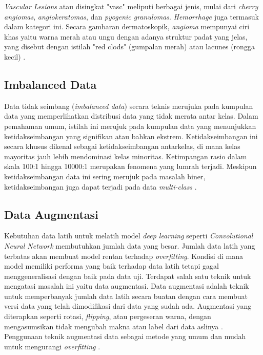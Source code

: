 \textit{Vascular Lesions} atau disingkat "vasc" meliputi berbagai jenis, 
mulai dari \textit{cherry angiomas}, \textit{angiokeratomas}, dan \textit{
pyogenic granulomas}. \textit{Hemorrhage} juga termasuk dalam kategori ini.
Secara gambaran dermatoskopik, \textit{angioma} mempunyai ciri khas yaitu 
warna merah atau ungu dengan adanya struktur padat yang jelas, yang disebut
dengan istilah "red clods" (gumpalan merah) atau lacunes (rongga kecil) \cite{tschandl2018ham10000}. \par


\subsection{Imbalanced Data} \label{II.Teori2}
Data tidak seimbang (\textit{imbalanced data}) secara teknis merujuka pada 
kumpulan data yang memperlihatkan distribusi data yang tidak merata antar 
kelas. Dalam pemahaman umum, istilah ini merujuk pada kumpulan data yang 
menunjukkan ketidakseimbangan yang signifikan atau bahkan ekstrem. 
Ketidakseimbangan ini secara khusus dikenal sebagai ketidakseimbangan 
antarkelas, di mana kelas mayoritas jauh lebih mendominasi kelas minoritas. 
Ketimpangan rasio dalam skala 100:1 hingga 10000:1 merupakan fenomena yang 
lumrah terjadi. Meskipun ketidakseimbangan data ini sering merujuk pada 
masalah biner, ketidakseimbangan juga dapat terjadi pada data 
\textit{multi-class} \cite{5128907}. \par


\subsection{Data Augmentasi} \label{II.Teori3}
Kebutuhan data latih untuk melatih model \textit{deep learning} seperti
\textit{Convolutional Neural Network} membutuhkan jumlah data yang besar. 
Jumlah data latih yang terbatas akan membuat model rentan terhadap 
\textit{overfitting}. Kondisi di mana model memiliki performa yang baik 
terhadap data latih tetapi gagal menggeneralisasi dengan baik pada data 
uji. Terdapat salah satu teknik untuk mengatasi masalah ini yaitu data 
augmentasi. Data augmentasi adalah teknik untuk memperbanyak jumlah data 
latih secara buatan dengan cara membuat versi data yang telah dimodifikasi 
dari data yang sudah ada. Augmentasi yang diterapkan seperti rotasi, 
\textit{flipping}, atau pergeseran warna, dengan mengasumsikan tidak 
mengubah makna atau label dari data aslinya \cite{Goodfellow-et-al-2016}. Penggunaan teknik 
augmentasi data sebagai metode yang umum dan mudah untuk mengurangi 
\textit{overfitting} \cite{NIPS2012_c399862d}. \par

